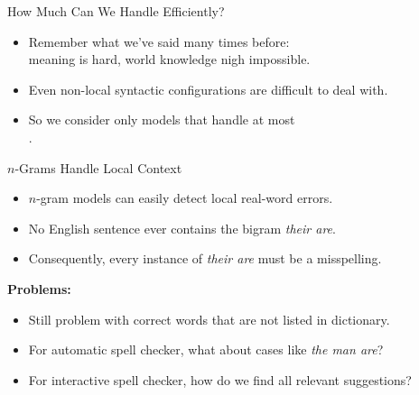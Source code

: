 \documentclass[professionalfonts, xcolor={usenames,svgnames,x11names,table}]{beamer}
\begin{document}
\begin{frame}{How Much Can We Handle Efficiently?}
    \begin{itemize}
        \item Remember what we've said many times before:\\
            meaning is hard, world knowledge nigh impossible.
        \item Even non-local syntactic configurations are difficult to deal with.
        \item So we consider only models that handle at most\\
            .
    \end{itemize}
\end{frame}

\begin{frame}{$n$-Grams Handle Local Context}
    \begin{itemize}
        \item $n$-gram models can easily detect local real-word errors.
    \end{itemize}
    \begin{example}
        \begin{itemize}
            \item No English sentence ever contains the bigram \emph{their are}.
            \item Consequently, every instance of \emph{their are} must be a misspelling.
        \end{itemize}
    \end{example}
    \pause
    \textbf{Problems:}
    \begin{itemize}
        \item Still problem with correct words that are not listed in dictionary.
        \item For automatic spell checker, what about cases like \emph{the man are}?\\
        \item For interactive spell checker, how do we find all relevant suggestions?
    \end{itemize}
\end{frame}
\end{document}

